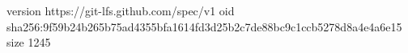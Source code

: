 version https://git-lfs.github.com/spec/v1
oid sha256:9f59b24b265b75ad4355bfa1614fd3d25b2c7de88bc9c1ccb5278d8a4e4a6e15
size 1245
